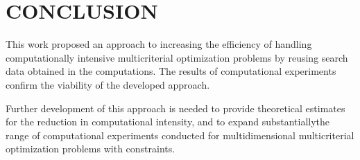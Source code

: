 \documentclass{aip-cp}
\begin{document}
\section{CONCLUSION}

This work proposed an approach to increasing the efficiency of handling computationally intensive multicriterial optimization problems by reusing search data obtained in the computations. The results of computational experiments confirm the viability of the developed approach. \par

Further development of this approach is needed to provide theoretical estimates for the reduction in computational intensity, and to expand substantiallythe range of computational experiments conducted for multidimensional multicriterial optimization problems with constraints.

\nocite{*}
%
%
\end{document}
